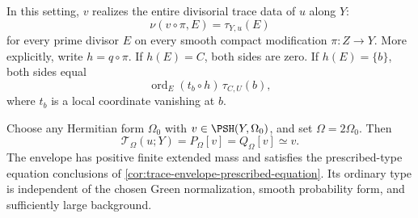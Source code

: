 \begin{theorem}\label{thm:curve-fibration-exact-trace}
In this setting, $v$ realizes the entire divisorial trace data of $u$ along $Y$:
\[
 \nu(v\circ\pi,E)=\tau_{Y,u}(E)
\]
for every prime divisor $E$ on every smooth compact modification $\pi:Z\to Y$. More explicitly, write $h=q\circ\pi$. If $h(E)=C$, both sides are zero. If $h(E)=\{b\}$, both sides equal
\[
 \operatorname{ord}_E(t_b\circ h)\,\tau_{C,U}(b),
\]
where $t_b$ is a local coordinate vanishing at $b$.

Choose any Hermitian form $\Omega_0$ with $v\in\PSH(Y,\Omega_0)$, and set $\Omega=2\Omega_0$. Then
\begin{equation}\label{eq:curve-fibration-trace-envelope}
 \mathcal T_\Omega(u;Y)=P_\Omega[v]=Q_\Omega[v]\simeq v.
\end{equation}
The envelope has positive finite extended mass and satisfies the prescribed-type equation conclusions of \cref{cor:trace-envelope-prescribed-equation}. Its ordinary type is independent of the chosen Green normalization, smooth probability form, and sufficiently large background.
\end{theorem}
